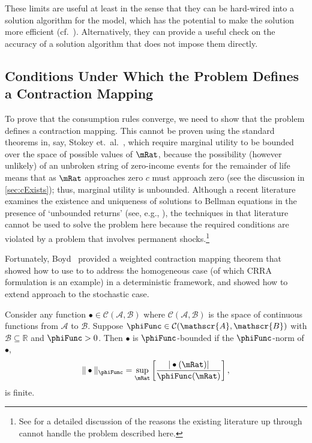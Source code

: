 \documentclass[titlepage]{\econtex}\providecommand{\texname}{BufferStockTheory}
\begin{document}
These limits are useful at least in the sense that they can be hard-wired into a solution algorithm for the model, which has the potential to make the solution more efficient (cf.\ \cite{cctwMoM}).  Alternatively, they can provide a useful check on the accuracy of a solution algorithm that does not impose them directly.

\begin{comment}
If the FHWC does not hold, we make do with a less useful bound on the minimal MPC: It is
weakly greater than zero, which follows from the logic in
\ref{sec:cExists}; hence the `max' in \eqref{eq:MinMinMPCDef}.
\end{comment}

\hypertarget{Conditions-Under-Which-the-Problem-Defines-a-Contraction-Mapping}{}
\subsection{Conditions Under Which the Problem Defines a Contraction Mapping}

\label{subsec:contraction}

To prove that the consumption rules converge, we need to show that the
problem defines a contraction mapping. This cannot be proven using the
standard theorems in, say, Stokey et.\ al.~\citeyearpar{slpMethods},
which require marginal utility to be bounded over the space of
possible values of $\mRat$, because the possibility (however unlikely)
of an unbroken string of zero-income events for the remainder of life
means that as $\mRat$ approaches zero $c$ must approach zero (see the
discussion in \ref{sec:cExists}); thus, marginal utility is unbounded.
Although a recent literature examines the existence and uniqueness 
of solutions to Bellman equations in the presence of `unbounded returns' (see, e.g.,
\cite{mnUnique}), the techniques in that literature
cannot be used to solve the problem here because the required conditions 
are violated by a problem that involves permanent shocks.\footnote{See \cite{yaoNote}
for a detailed discussion of the reasons the existing literature up through \cite{mnUnique} cannot handle 
the problem described here.}

Fortunately, Boyd~\citeyearpar{jboydWeighted} provided a weighted contraction mapping theorem that \cite{asHomogeneous} showed how to use to to address the homogeneous case (of which CRRA formulation is an example) in a deterministic framework, and \cite{duranDiscounting} showed how to extend \cite{jboydWeighted} approach to the stochastic case.
\begin{defn}
Consider any function $\bullet\in \mathcal{C}(\mathscr{A},\mathscr{B})$ where $\mathcal{C}(\mathscr{A},\mathscr{B})$ is the space of continuous functions from $\mathscr{A}$ to $%
\mathscr{B}$. Suppose $\phiFunc \in \mathcal{C}(\mathscr{A},\mathscr{B})$ with $%
\mathscr{B}\subseteq\mathbb{R}$ and $\phiFunc >0$. Then $\bullet$ is $\phiFunc$-bounded if the $\phiFunc$-norm of $\bullet$,
\begin{equation}
\Vert \bullet\Vert _{\phiFunc }=\sup_{\mRat}\left[ \frac{|\bullet(\mRat)|}{\phiFunc (\mRat)}\right] ,
\label{eq:phinorm}
\end{equation}%
is finite.
\end{defn}
\end{document}
